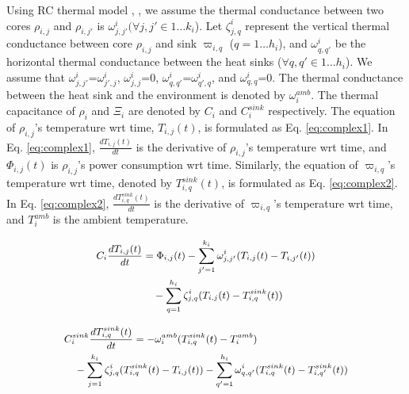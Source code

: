\documentclass[conference]{IEEEtran}
\begin{document}
Using RC thermal model \cite{Chantem10}, \cite{Fisher09}, we assume the thermal conductance between two cores $\rho_{i,j}$ and $\rho_{i,j'}$ is 
$\omega^{i}_{j,j'} (\forall j,j' \in 1\ldots k_i$). %
Let $\zeta^{i}_{j,q}$ represent the vertical thermal conductance
between core $\rho_{i,j}$ and sink $\varpi_{i,q}$ ($q=1\ldots h_i$), and $\omega^{i}_{q,q'}$ be the horizontal thermal conductance between
the heat sinks ($\forall q,q' \in 1\ldots h_i$).
We assume that $\omega^{i}_{j,j'}$=$\omega^{i}_{j',j}$, $\omega^{i}_{j,j}$=$0$, $\omega^{i}_{q,q'}$=$\omega^{i}_{q',q}$, and
$\omega^{i}_{q,q}$=$0$. The thermal conductance between the heat sink and the environment is denoted by $\omega_i^{amb}$.
The thermal capacitance of $\rho_i$ and $\Xi_i$ are denoted by $C_i$ and $C^{sink}_i$ respectively.
The equation of $\rho_{i,j}$'s temperature wrt time, $T_{i,j}(t)$, is formulated as  Eq. \ref{eq:complex1}.
In  Eq. \ref{eq:complex1}, $\frac{dT_{i,j}(t)}{dt}$ is the derivative of $\rho_{i,j}$'s  temperature wrt time, and 
$\Phi_{i,j}(t)$ is $\rho_{i,j}$'s power consumption wrt time.
Similarly, the equation of $\varpi_{i,q}$'s temperature wrt time, denoted by $T^{sink}_{i,q}(t)$, is formulated as  Eq. \ref{eq:complex2}.
In  Eq. \ref{eq:complex2}, $\frac{dT^{sink}_{i,q}(t)}{dt}$ is the derivative of $\varpi_{i,q}$'s temperature wrt time, and
$T_i^{amb}$ is the ambient temperature.


\vspace{-0.2in}

\begin{equation}\label{eq:complex1}
\footnotesize
\begin{split}
	C_i \frac{dT_{i,j}(t)}{dt} &= \Phi_{i,j}(t) - \sum_{j'=1}^{k_i} \omega^{i}_{j,j'} ( T_{i,j}(t) - T_{i,j'}(t) ) \\
	&\quad  - \sum_{q=1}^{h_i} \zeta^{i}_{j,q} ( T_{i,j}(t) - T^{sink}_{i,q}(t) )
\end{split}
\end{equation}

\vspace{-0.23in}

\begin{equation}\label{eq:complex2}
\footnotesize
\begin{split}
	&C^{sink}_i \frac{dT^{sink}_{i,q}(t)}{dt} = - \omega_i^{amb} (T_{i,q}^{sink}(t) - T_i^{amb}) \\
 	&\quad - \sum_{j=1}^{k_i} \zeta^{i}_{j,q} (T^{sink}_{i,q}(t) - T_{i,j}(t)) %
	 	- \sum_{q'=1}^{h_i} \omega^{i}_{q,q'} (T^{sink}_{i,q}(t) - T^{sink}_{i,q'}(t) )
\end{split}
\end{equation}
\end{document}
